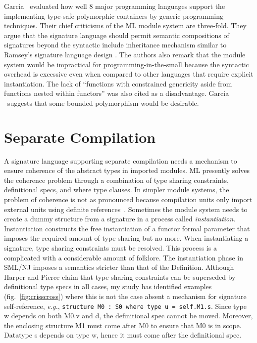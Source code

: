 Garcia \etal\cite{garcia05:extendedcomparing05}~evaluated how well 8 major programming languages support the implementing type-safe polymorphic containers by generic programming techniques. 
Their chief criticisms of the ML module system are three-fold. They argue that the signature language should permit semantic compositions of signatures beyond the syntactic include inheritance mechanism similar to Ramsey's signature language design \cite{ramsey05}. The authors also remark that the module system would be impractical for programming-in-the-small because the syntactic overhead is excessive even when compared to other languages that require explicit instantiation. The lack of ``functions with constrained genericity aside from functions nested within functors'' was also cited as a disadvantage. Garcia \etal~suggests that some bounded polymorphism would be desirable. 

\section{Separate Compilation}

A signature language supporting separate compilation needs a mechanism to ensure coherence of the abstract types in imported modules. ML presently solves the coherence problem through a combination of type sharing constraints, definitional specs, and where type clauses. In simpler module systems, the problem of coherence is not as pronounced because compilation units only import external units using definite references~\cite{swasey06}. Sometimes the module system needs to create a dummy structure from a signature in a process called \emph{instantiation}. Instantiation constructs the free instantiation of a functor formal parameter that imposes the required amount of type sharing but no more. When instantiating a signature, type sharing constraints must be resolved. This process is a complicated with a considerable amount of folklore. The instantiation phase in SML/NJ imposes a semantics stricter than that of the Definition. Although Harper and Pierce \cite{ATTAPL} claim that type sharing constraints can be superseded by definitional type specs in all cases, my study has identified examples (fig.~\ref{fig:crisscross}) where this is not the case absent a mechanism for signature self-reference, {\it e.g.}, \lstinline{structure M0 : S0 where type u = self.M1.s}. Since type w depends on both M0.v and d, the definitional spec cannot be moved. Moreover, the enclosing structure M1 must come after M0 to ensure that M0 is in scope. Datatype s depends on type w, hence it must come after the definitional spec. 

